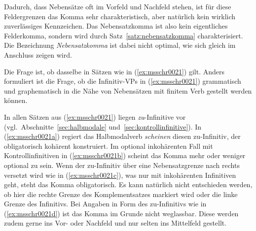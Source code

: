 Dadurch, dass Nebensätze oft im Vorfeld und Nachfeld stehen, ist für diese Feldergrenzen das Komma sehr charakteristisch, aber natürlich kein wirklich zuverlässiges Kennzeichen.
Das Nebensatzkomma ist also kein eigentliches Felderkomma, sondern wird durch Satz~\ref{satz:nebensatzkomma} charakterisiert.
Die Bezeichnung \textit{Nebensatzkomma} ist dabei nicht optimal, wie sich gleich im Anschluss zeigen wird.


Die Frage ist, ob dasselbe in Sätzen wie in (\ref{ex:msschr0021}) gilt.
Anders formuliert ist die Frage, ob die Infinitiv-VPs in (\ref{ex:msschr0021}) grammatisch und graphematisch in die Nähe von Nebensätzen mit finitem Verb gestellt werden können.

\begin{exe}
  \ex\label{ex:msschr0021} 
  \begin{xlist}
  \end{xlist}
\end{exe}

In allen Sätzen aus (\ref{ex:msschr0021}) liegen \textit{zu}-Infinitive vor (vgl.\ Abschnitte~\ref{sec:halbmodale} und~\ref{sec:kontrollinfinitive}).
In (\ref{ex:msschr0021a}) regiert das Halbmodalverb \textit{scheinen} diesen zu-Infinitiv, der obligatorisch kohärent konstruiert.
Im optional inkohärenten Fall mit Kontrollinfinitiven in (\ref{ex:msschr0021b}) scheint das Komma mehr oder weniger optional zu sein.
Wenn der zu-Infinitiv über eine Nebensatzgrenze nach rechts versetzt wird wie in (\ref{ex:msschr0021c}), was nur mit inkohärenten Infinitiven geht, steht das Komma obligatorisch.
Es kann natürlich nicht entschieden werden, ob hier die rechte Grenze des Komplementsatzes markiert wird oder die linke Grenze des Infinitivs.
Bei Angaben in Form des zu-Infinitivs wie in (\ref{ex:msschr0021d}) ist das Komma im Grunde nicht weglassbar.
Diese werden zudem gerne ins Vor- oder Nachfeld und nur selten ins Mittelfeld gestellt.

